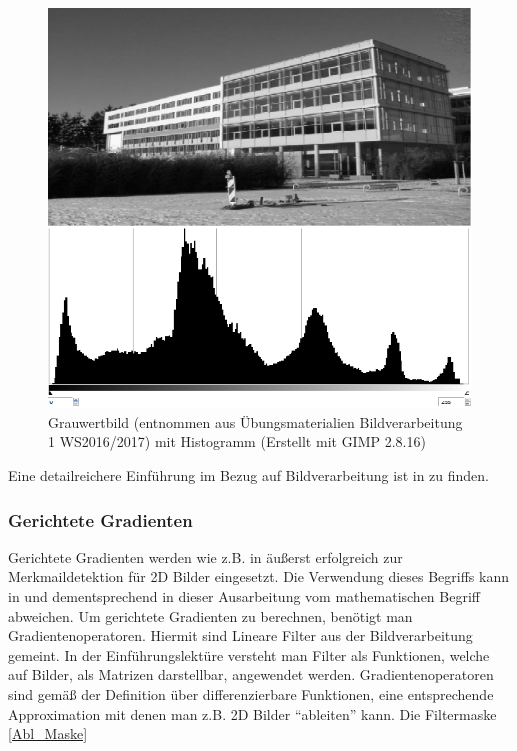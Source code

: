 \begin{figure}[thpb]
	\centering
	\includegraphics[width=\linewidth]{1-Einleitung/pics/pic_histo_uni01.png}
	\caption{Grauwertbild (entnommen aus Übungsmaterialien Bildverarbeitung 1 WS2016/2017) mit Histogramm (Erstellt mit GIMP 2.8.16)}
	\label{histo_pic}
\end{figure}



Eine detailreichere Einführung im Bezug auf Bildverarbeitung ist in \cite{Priese15} zu finden.

\subsubsection{Gerichtete Gradienten}
Gerichtete Gradienten werden wie z.B. in \cite{dalal2005histograms} äußerst erfolgreich zur Merkmaildetektion für 2D Bilder eingesetzt. Die Verwendung dieses Begriffs kann in \cite{scherer2010histograms} und dementsprechend in dieser Ausarbeitung vom mathematischen Begriff abweichen.
\newline
Um gerichtete Gradienten zu berechnen, benötigt man Gradientenoperatoren. Hiermit sind Lineare Filter aus der Bildverarbeitung gemeint. In der Einführungslektüre \cite{Priese15} versteht man Filter als Funktionen, welche auf Bilder, als Matrizen darstellbar, angewendet werden. Gradientenoperatoren sind gemäß der Definition über differenzierbare Funktionen, eine entsprechende Approximation mit denen man z.B. 2D Bilder "`ableiten"' kann. Die Filtermaske \ref{Abl_Maske} 

